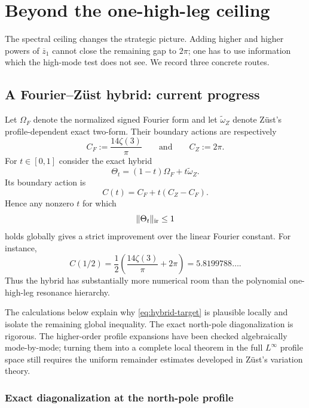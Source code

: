\documentclass[11pt]{article}
\begin{document}
\section{Beyond the one-high-leg ceiling}
\label{sec:beyond-ceiling}

The spectral ceiling changes the strategic picture.  Adding higher and higher
powers of $\overline z_1$ cannot close the remaining gap to $2\pi$; one has to use
information which the high-mode test does not see.  We record three concrete
routes.


\subsection{A Fourier--Z\"ust hybrid: current progress}
\label{subsec:hybrid-progress}

Let $\Omega_F$ denote the normalized signed Fourier form and let
$\widetilde\omega_Z$ denote Z\"ust's profile-dependent exact two-form.
Their boundary actions are respectively
\[
        C_F:=\frac{14\zeta(3)}{\pi}
        \qquad\text{and}\qquad
        C_Z:=2\pi.
\]
For $t\in[0,1]$ consider the exact hybrid
\begin{equation}\label{eq:hybrid-form}
        \Theta_t=(1-t)\Omega_F+t\widetilde\omega_Z.
\end{equation}
Its boundary action is
\begin{equation}\label{eq:hybrid-action}
        C(t)=C_F+t(C_Z-C_F).
\end{equation}
Hence any nonzero $t$ for which
\begin{equation}\label{eq:hybrid-target}
        \|\Theta_t\|_{\rm ir}\le1
\end{equation}
holds globally gives a strict improvement over the linear Fourier
constant.  For instance,
\[
        C(1/2)
        =\frac12\left(
        \frac{14\zeta(3)}{\pi}+2\pi
        \right)
        =5.8199788\ldots.
\]
Thus the hybrid has substantially more numerical room than the polynomial
one-high-leg resonance hierarchy.

The calculations below explain why \eqref{eq:hybrid-target} is plausible
locally and isolate the remaining global inequality.  The exact
north-pole diagonalization is rigorous.  The higher-order profile
expansions have been checked algebraically mode-by-mode; turning them into
a complete local theorem in the full $L^\infty$ profile space still
requires the uniform remainder estimates developed in Z\"ust's variation
theory.

\subsubsection{Exact diagonalization at the north-pole profile}
\end{document}
